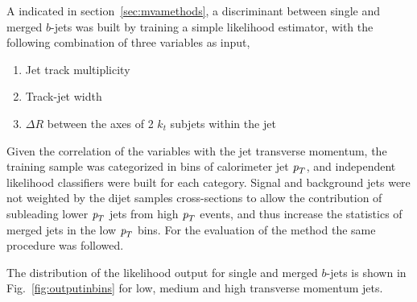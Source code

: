 


A indicated in section~\ref{sec:mvamethods}, a discriminant between single and merged $b$-jets was built by training a simple likelihood estimator, with the following combination of three variables as input, 
%
\begin{enumerate}\addtolength{\itemsep}{-0.4\baselineskip}
\item
Jet track multiplicity
\item
Track-jet width
\item
$\Delta R$ between the axes of 2 $k_t$ subjets within the jet
\end{enumerate}
%

Given the correlation of the variables with the jet transverse momentum,  the training sample was categorized in bins of calorimeter jet ${\emph{p}_{T}}$, and independent likelihood classifiers were built for each category.  Signal and background jets were not weighted by the dijet samples cross-sections to allow the contribution of subleading lower ${\emph{p}_{T}}$ jets from high ${\emph{p}_{T}}$ events, and thus increase the statistics of merged jets in the low ${\emph{p}_{T}}$ bins. For the evaluation of the method the same procedure was followed.

The distribution of the likelihood output for single and merged $b$-jets is shown in  Fig.~\ref{fig:outputinbins} for low, medium and high transverse momentum jets.

